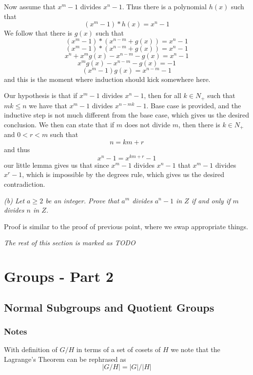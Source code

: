\documentclass[11pt,oneside,titlepage]{book}
\begin{document}
Now assume that $x^m - 1$ divides $x^n - 1$. Thus there is a
polynomial $h(x)$ such that
$$(x^m - 1) * h(x) = x^n - 1$$
We follow that there is $g(x)$ such that
$$(x^m - 1) * (x^{n - m} + g(x)) = x^n - 1$$
$$(x^m - 1) * (x^{n - m} + g(x)) = x^n - 1$$
$$x^n + x^mg(x) - x^{n - m} - g(x)  = x^n - 1$$
$$x^mg(x) - x^{n - m} - g(x)  =  - 1$$
$$(x^m - 1)g(x) = x^{n - m}  - 1$$
and this is the moment where induction should kick somewhere here.

Our hypothesis is that if $x^m - 1$ divides $x^n - 1$, then for all $k
\in N_+$ such that $mk \leq n$ we have that $x^m - 1$ divides $x^{n -
mk} - 1$. Base case is provided, and the inductive step is not much
different from the base case, which gives us the desired
conclusion. We then can state that if $m$ does not divide $m$, then
there is $k \in N_+$ and $0 < r < m$ such that
$$n = km + r$$
and thus
$$x^{n} - 1 = x^{km + r} - 1$$
our little lemma gives us that since $x^m - 1$ divides $x^n - 1$ that
$x^m - 1$ divides $x^{r} - 1$, which is impossible by the degrees
rule, which gives us the desired contradiction.

\textit{(b) Let $a \geq 2$ be an integer. Prove that $a^m$ divides
$a^n - 1$ in $Z$ if and only if $m$ divides $n$ in $Z$.}

Proof is similar to the proof of previous point, where we swap
appropriate things.

\textit{The rest of this section is marked as TODO}

\chapter{Groups - Part 2}

\section{Normal Subgroups and Quotient Groups}

\subsection*{Notes}

With definition of $G/H$ in terms of a set of cosets of $H$ we note
that the Lagrange's Theorem can be rephrased as
$$|G/H| = |G|/|H|$$

\subsection{}
\end{document}

